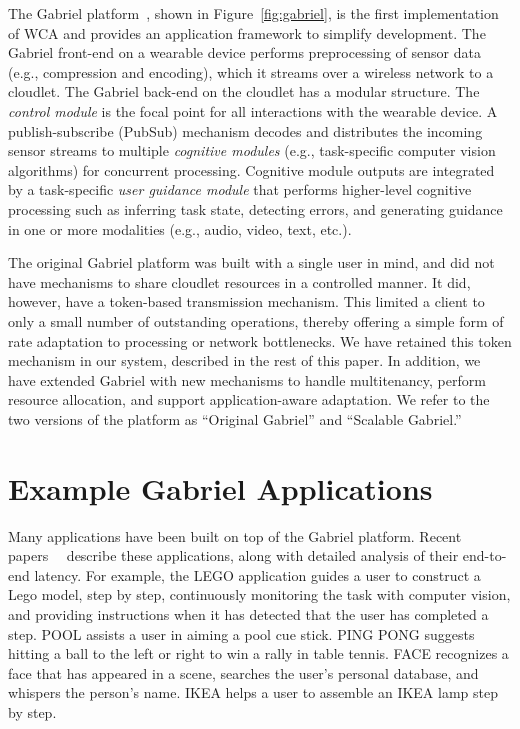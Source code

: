 The Gabriel platform~\cite{ha2014towards,chen2017empirical}, shown in
Figure~\ref{fig:gabriel}, is the first implementation of WCA and provides an
application framework to simplify development. The Gabriel front-end on a
wearable device performs preprocessing of sensor data (e.g., compression and
encoding), which it streams over a wireless network to a cloudlet.  The Gabriel
back-end on the cloudlet has a modular structure. The {\em control module} is
the focal point for all interactions with the wearable device.  A
publish-subscribe (PubSub) mechanism decodes and distributes the incoming sensor
streams to multiple {\em cognitive modules} (e.g., task-specific computer vision
algorithms) for concurrent processing. Cognitive module outputs are integrated
by a task-specific {\em user guidance module} that performs higher-level
cognitive processing such as inferring task state, detecting errors, and
generating guidance in one or more modalities (e.g., audio, video, text, etc.).

The original Gabriel platform was built with a single user in mind,
and did not have mechanisms to share cloudlet resources in a
controlled manner.  It did, however, have a token-based transmission
mechanism.  This limited a client to only a small number of
outstanding operations, thereby offering a simple form of rate
adaptation to processing or network bottlenecks.  We have retained
this token mechanism in our system, described in the rest of this paper.
In addition, we have extended Gabriel with new mechanisms to handle
multitenancy, perform resource allocation, and support
application-aware adaptation.  We refer to the two versions of the
platform as ``Original Gabriel'' and ``Scalable Gabriel.''

\section{Example Gabriel Applications}

Many applications have been built on top of the Gabriel platform.  Recent
papers~\cite{chen2017empirical}~\cite{chen2018application} describe these applications,
along with detailed analysis of their end-to-end latency. For example, the LEGO
application guides a user to construct a Lego model, step by step, continuously
monitoring the task with computer vision, and providing instructions when it has
detected that the user has completed a step. POOL assists a user in aiming a
pool cue stick. PING PONG suggests hitting a ball to the left or right to win a
rally in table tennis. FACE recognizes a face that has appeared in a scene,
searches the user's personal database, and whispers the person's name. IKEA
helps a user to assemble an IKEA lamp step by step.

